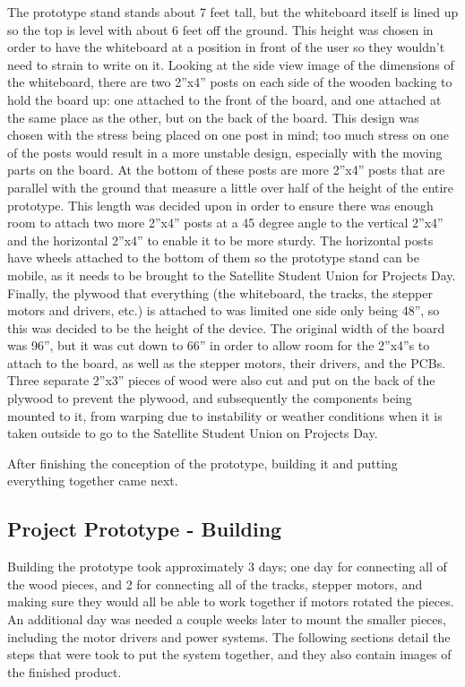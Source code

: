 The prototype stand stands about 7 feet tall, but the whiteboard itself is lined up so the top is level with about 6 feet off the ground. This height was chosen in order to have the whiteboard at a position in front of the user so they wouldn't need to strain to write on it. Looking at the side view image of the dimensions of the whiteboard, there are two 2''x4'' posts on each side of the wooden backing to hold the board up: one attached to the front of the board, and one attached at the same place as the other, but on the back of the board. This design was chosen with the stress being placed on one post in mind; too much stress on one of the posts would result in a more unstable design, especially with the moving parts on the board. At the bottom of these posts are more 2''x4'' posts that are parallel with the ground that measure a little over half of the height of the entire prototype. This length was decided upon in order to ensure there was enough room to attach two more 2''x4'' posts at a 45 degree angle to the vertical 2''x4'' and the horizontal 2''x4'' to enable it to be more sturdy. The horizontal posts have wheels attached to the bottom of them so the prototype stand can be mobile, as it needs to be brought to the Satellite Student Union for Projects Day. Finally, the plywood that everything (the whiteboard, the tracks, the stepper motors and drivers, etc.) is attached to was limited one side only being 48'', so this was decided to be the height of the device. The original width of the board was 96'', but it was cut down to 66'' in order to allow room for the 2''x4''s to attach to the board, as well as the stepper motors, their drivers, and the PCBs. Three separate 2''x3'' pieces of wood were also cut and put on the back of the plywood to prevent the plywood, and subsequently the components being mounted to it, from warping due to instability or weather conditions when it is taken outside to go to the Satellite Student Union on Projects Day. \par
\setlength{\parindent}{2.5ex}
After finishing the conception of the prototype, building it and putting everything together came next.

\subsection{Project Prototype - Building}
Building the prototype took approximately 3 days; one day for connecting all of the wood pieces, and 2 for connecting all of the tracks, stepper motors, and making sure they would all be able to work together if motors rotated the pieces. An additional day was needed a couple weeks later to mount the smaller pieces, including the motor drivers and power systems. The following sections detail the steps that were took to put the system together, and they also contain images of the finished product.

